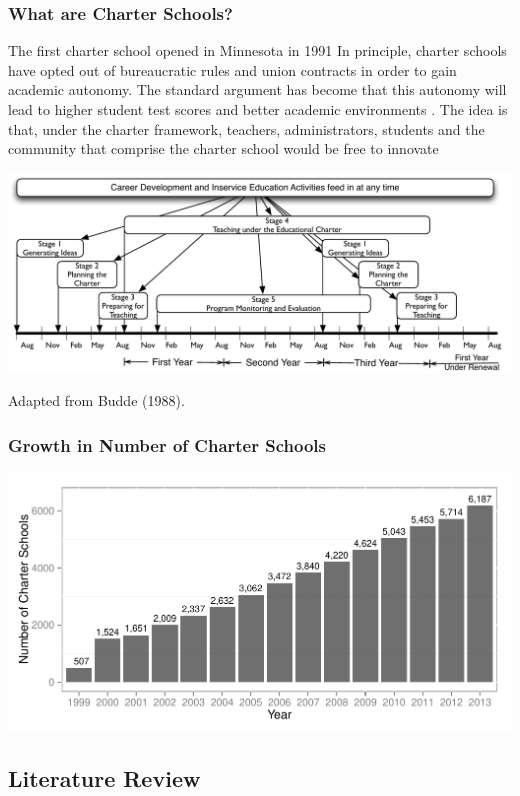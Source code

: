 \documentclass[10pt,handout,mathserif]{beamer}
\begin{document}
\begin{frame}
	\frametitle{What are Charter Schools?}
	The first charter school opened in Minnesota in 1991
	In principle, charter schools have opted out of bureaucratic rules and union contracts in order to gain academic autonomy. The standard argument has become that this autonomy will lead to higher student test scores and better academic environments \cite{Wells2002}. The idea is that, under the charter framework, teachers, administrators, students and the community that comprise the charter school would be free to innovate
	
	\includegraphics[width=\textwidth,keepaspectratio=true]{../Figures/Timeline.pdf}
	
	\footnotesize Adapted from Budde (1988).
\end{frame}

\begin{frame}[c]
	\frametitle{Growth in Number of Charter Schools}
	\includegraphics[width=\textwidth,keepaspectratio=true]{../Figures/CharterSchoolGrowth.pdf}
\end{frame}

\subsection{Literature Review}
\end{document}
